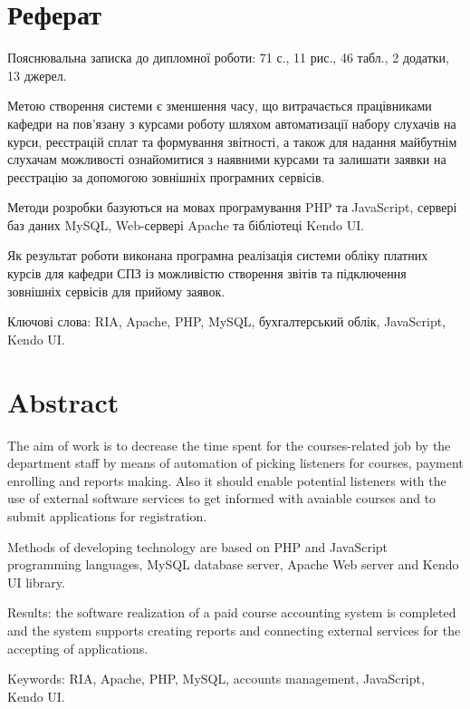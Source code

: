 \newpage
\section*{Реферат}
\bigbreak
Пояснювальна записка до дипломної роботи: 71 с., 11 рис., 46 табл., 2 додатки, 13 джерел.

Метою створення системи є зменшення часу, що витрачається працівниками кафедри на пов'язану з курсами роботу шляхом автоматизації набору слухачів на курси, реєстрацій сплат та формування звітності, а також для надання майбутнім слухачам можливості ознайомитися з наявними курсами та залишати заявки на реєстрацію за допомогою зовнішніх програмних сервісів.

Методи розробки базуються на мовах програмування PHP та JavaScript, сервері баз даних MySQL, Web-сервері Apache та бібліотеці Kendo UI.

Як результат роботи виконана програмна реалізація системи обліку платних курсів для кафедри СПЗ із можливістю створення звітів та підключення зовнішніх сервісів для прийому заявок.

Ключові слова: RIA, Apache, PHP, MySQL, бухгалтерський облік, JavaScript, Kendo UI.
\newpage
\section*{Abstract}
The aim of work is to decrease the time spent for the courses-related job by the department staff by means of automation of picking listeners for courses, payment enrolling and reports making. Also it should enable potential listeners with the use of external software services to get informed with avaiable courses and to submit applications for registration.

Methods of developing technology are based on PHP and JavaScript programming languages, MySQL database server, Apache Web server and Kendo UI library.

Results: the software realization of a paid course accounting system is completed and the system supports creating reports and connecting external services for the accepting of applications.

Keywords: RIA, Apache, PHP, MySQL, accounts management, JavaScript, Kendo UI.
